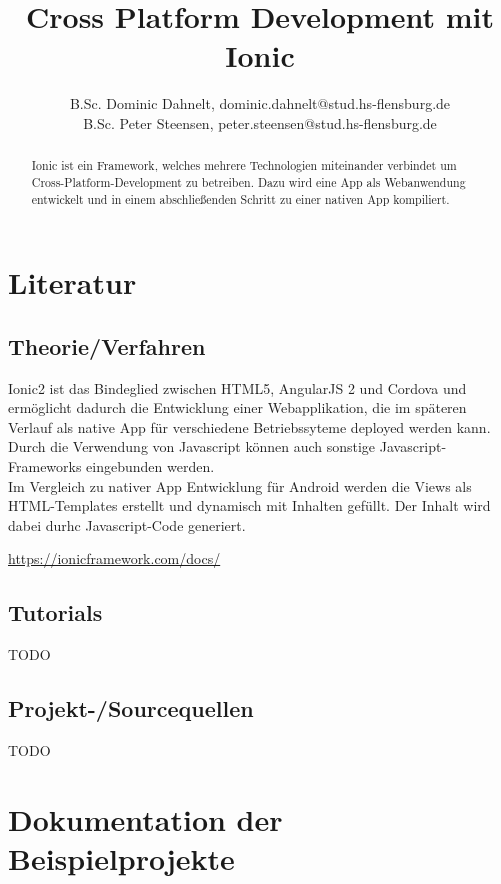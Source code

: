 \documentclass[german]{lni}
\author{B.Sc. Dominic Dahnelt, dominic.dahnelt@stud.hs-flensburg.de\\
B.Sc. Peter Steensen, peter.steensen@stud.hs-flensburg.de}
\title{Cross Platform Development mit Ionic}
\begin{document}
\maketitle

\begin{abstract}
	Ionic ist ein Framework, welches mehrere Technologien miteinander verbindet um Cross-Platform-Development zu betreiben. Dazu wird eine App als Webanwendung entwickelt und in einem abschließenden Schritt zu einer nativen App kompiliert.
\end{abstract}

\section{Literatur}
\subsection{Theorie/Verfahren}
Ionic2 ist das Bindeglied zwischen HTML5, AngularJS 2 und Cordova und ermöglicht dadurch die Entwicklung einer Webapplikation, die im späteren Verlauf als native App für verschiedene Betriebssyteme deployed werden kann. Durch die Verwendung von Javascript können auch sonstige Javascript-Frameworks eingebunden werden.
\\
Im Vergleich zu nativer App Entwicklung für Android  werden die Views als HTML-Templates erstellt und dynamisch mit Inhalten gefüllt. Der Inhalt wird dabei durhc Javascript-Code generiert.
\par 
\url{https://ionicframework.com/docs/}

\subsection{Tutorials}
TODO
\subsection{Projekt-/Sourcequellen}
TODO

\section{Dokumentation der Beispielprojekte}
\end{document}

